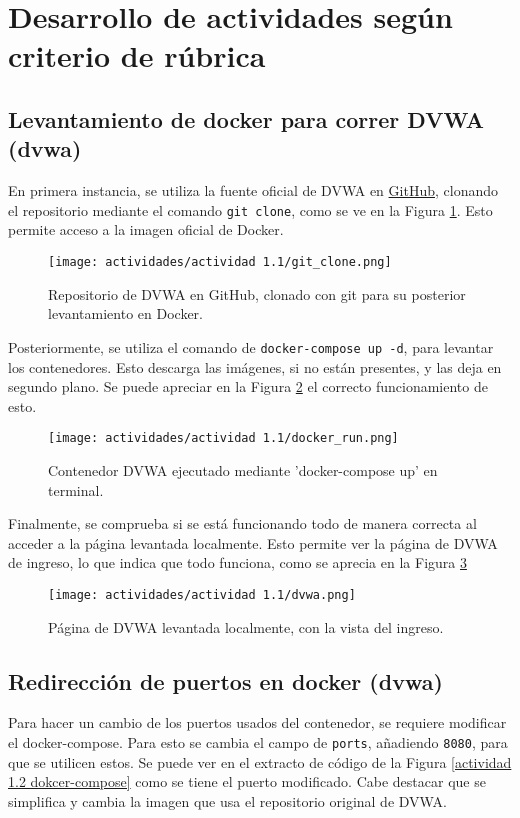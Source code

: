 \documentclass[letter,12pt]{article}
\begin{document}
\section{Desarrollo de actividades según criterio de rúbrica}

\subsection{Levantamiento de docker para correr DVWA (dvwa)}
En primera instancia, se utiliza la fuente oficial de DVWA en \href{https://github.com/BrunoTrone1/cripto_lab1/blob/main/algoritmo_cifrado.py}{GitHub}, clonando el repositorio mediante el comando \verb|git clone|, como se ve en la Figura \ref{actividad 1.1 git_clone}. Esto permite acceso a la imagen oficial de Docker.

\begin{figure}[H]
    \centering
    \texttt{[image: actividades/actividad 1.1/git\_clone.png]}
    \caption{Repositorio de DVWA en GitHub, clonado con git para su posterior levantamiento en Docker.}
    \label{actividad 1.1 git_clone}
\end{figure}

Posteriormente, se utiliza el comando de \verb|docker-compose up -d|, para levantar los contenedores. Esto descarga las imágenes, si no están presentes, y las deja en segundo plano. Se puede apreciar en la Figura \ref{actividad 1.1 docker_run} el correcto funcionamiento de esto.

\begin{figure}[H]
    \centering
    \texttt{[image: actividades/actividad 1.1/docker\_run.png]}
    \caption{Contenedor DVWA ejecutado mediante 'docker-compose up' en terminal.}
    \label{actividad 1.1 docker_run}
\end{figure}

Finalmente, se comprueba si se está funcionando todo de manera correcta al acceder a la página levantada localmente. Esto permite ver la página de DVWA de ingreso, lo que indica que todo funciona, como se aprecia en la Figura \ref{actividad 1.1 dvwa}

\begin{figure}[H]
    \centering
    \texttt{[image: actividades/actividad 1.1/dvwa.png]}
    \caption{Página de DVWA levantada localmente, con la vista del ingreso.}
    \label{actividad 1.1 dvwa}
\end{figure}



\subsection{Redirección de puertos en docker (dvwa)}
Para hacer un cambio de los puertos usados del contenedor, se requiere modificar el docker-compose. Para esto se cambia el campo de \verb|ports|, añadiendo \verb|8080|, para que se utilicen estos. Se puede ver en el extracto de código de la Figura \ref{actividad 1.2 dokcer-compose} como se tiene el puerto modificado. Cabe destacar que se simplifica y cambia la imagen que usa el repositorio original de DVWA.
\end{document}
